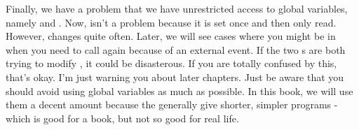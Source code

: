  

Finally, we have a problem that we have unrestricted access to global variables, namely
 and .  Now, 
 isn't a problem because it is set once and then only read.
However,  changes quite often.  Later, we will see
cases where you might be in  when you need to call
 again because of an external event.  If the two 
s are both trying to modify , 
it could be disasterous.  If you are totally confused by this, that's okay.  I'm just
warning you about later chapters.  Just be aware that you should avoid using global
variables as much as possible.  In this book, we will use them a decent amount because
the generally give shorter, simpler programs - which is good for a book, but not so good
for real life.

